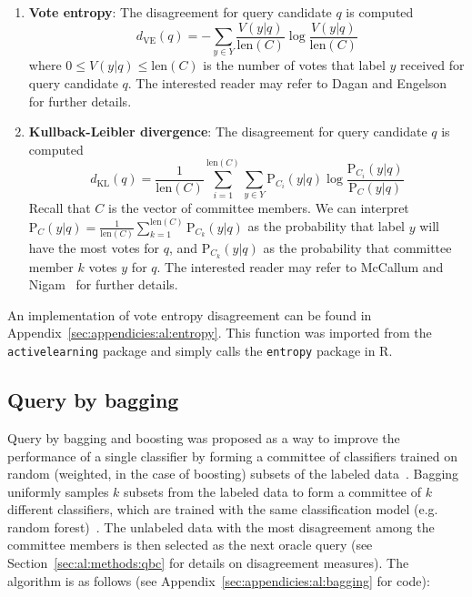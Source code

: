\tablespacing
\begin{enumerate}
	\item \textbf{Vote entropy}: The disagreement for query candidate $q$ is 
	computed
	$$d_{\text{VE}}(q) =-\sum\limits_{y \in Y} 
	\frac{V(y|q)}{\text{len}(C)} \log \frac{V(y|q)}{\text{len}(C)}$$
	\noindent where $0 \leq V(y|q) \leq \text{len}(C)$ is the number of votes 
	that label $y$ received for query candidate $q$. 
	The interested reader may refer to Dagan and 
	Engelson~\cite{dagan1995} for further details.
	
	\item \textbf{Kullback-Leibler divergence}: The disagreement for query 
	candidate $q$ is computed
	$$d_{\text{KL}}(q) = \frac{1}{\text{len}(C)} \sum\limits_{i =
	1}^{\text{len}(C)} \sum\limits_{y \in Y} 
	\text{P}_{C_i}(y|q) \log \frac{\text{P}_{C_i}(y|q)}
	{\text{P}_{C}(y|q)}$$
	\noindent Recall that $C$ is the vector of committee members. We can 
	interpret $\text{P}_{C}(y|q) = \frac{1}{\text{len}(C)} 
	\sum\limits_{k=1}^{\text{len}(C)} \text{P}_{C_k}(y|q)$ as the probability 
	that label $y$ will have the most votes for $q$, and 
	$\text{P}_{C_k}(y|q)$ as the probability that committee member $k$ votes 
	$y$ for $q$. The interested reader may refer to McCallum and 
	Nigam~\cite{mccallum1998} for further details.
\end{enumerate}
\bodyspacing

\noindent An implementation of vote entropy disagreement can be found in 
Appendix~\ref{sec:appendicies:al:entropy}. This function was imported from the 
\texttt{activelearning} package and simply calls the \texttt{entropy} 
package in R.









\subsection{Query by bagging}
\label{sec:al:methods:bagging}

Query by bagging and boosting was proposed
as a way to improve the performance of a single classifier by forming a 
committee of classifiers trained on random (weighted, in the case of boosting) 
subsets of the labeled data~\cite{abe1998}. 
Bagging uniformly samples $k$ subsets from the labeled data to form a committee 
of $k$ different classifiers, which are trained with the same classification 
model (e.g. random forest)~\cite{abe1998}. The unlabeled data with the most 
disagreement among the committee members is then selected as the next oracle 
query (see Section~\ref{sec:al:methods:qbc} for details on disagreement 
measures). The algorithm is as follows (see 
Appendix~\ref{sec:appendicies:al:bagging} for code):

